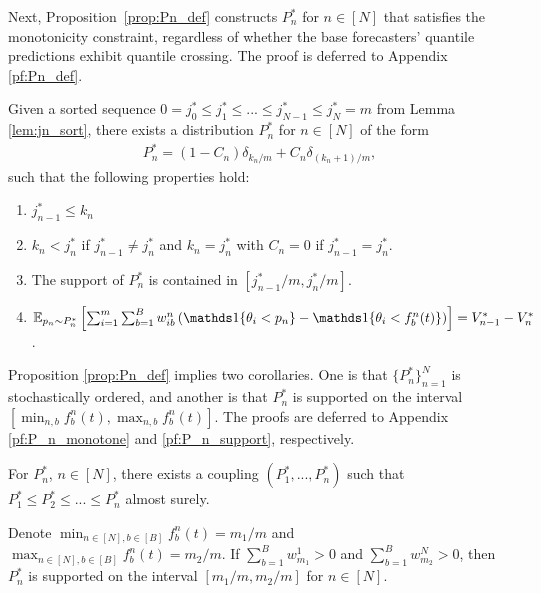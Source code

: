 Next, Proposition~\ref{prop:Pn_def} constructs $P_n^*$ for $n \in [N]$ that satisfies the monotonicity constraint, regardless of whether the base forecasters' quantile predictions exhibit quantile crossing. The proof is deferred to Appendix \ref{pf:Pn_def}.

\begin{prop} \label{prop:Pn_def}
Given a sorted sequence $0=j_0^* \leq j_1^* \leq ... \leq j_{N-1}^* \leq j_N^* = m$ from Lemma \ref{lem:jn_sort}, there exists a distribution $P_n^*$ for $n \in [N]$ of the form
\begin{align}\label{eq:Pn_def}
P_n^* = (1-C_n)\delta_{k_n / m} + C_n\delta_{(k_n+1)/m},
\end{align}
such that the following properties hold:
\begin{enumerate}
  \item $j_{n-1}^* \leq k_n$
  \item $k_n < j_n^*$ if $j_{n-1}^* \neq j_n^*$ and $k_n = j_n^*$ with $C_n=0$ if $j_{n-1}^* = j_n^*$.
  \item The support of $P_n^*$ is contained in $[j_{n-1}^*/m, j_n^*/m]$.
  \item $\E_{p_n \sim P_n^*} \left[ \sum_{i=1}^{m} \sum_{b=1}^B w_{ib}^n \left( \indi{\theta_i < p_n} - \indi{\theta_i < f_b^n(t)} \right) \right] = V_{n-1}^*-V_n^*$.
\end{enumerate}
\end{prop}


Proposition \ref{prop:Pn_def} implies two corollaries. One is that $\{P_n^*\}_{n=1}^N$ is stochastically ordered, and another is that $P_n^*$ is supported on the interval $[\min_{n,b} f_b^n(t), \max_{n,b} f_b^n(t)]$. The proofs are deferred to Appendix \ref{pf:P_n_monotone} and \ref{pf:P_n_support}, respectively.

\begin{corollary}\label{cor:P_n_monotone}
For $P_n^*$, $n \in [N]$, there exists a coupling $(P_1^*,..., P_n^*)$ such that $P_1^* \leq P_2^* \leq ... \leq P_n^*$ almost surely.
\end{corollary}

\begin{corollary}\label{cor:P_n_support}
Denote $\min_{n \in [N], b \in [B]} f_b^n(t) = m_1 /m$ and $\max_{n \in [N], b \in [B]} f_b^n(t) = m_2 /m$. If $\sum_{b=1}^B w_{m_1}^1 > 0$ and $\sum_{b=1}^B w_{m_2}^N > 0$, then $P_n^*$ is supported on the interval $[m_1 /m, m_2 /m]$ for $n \in [N]$.
\end{corollary}


